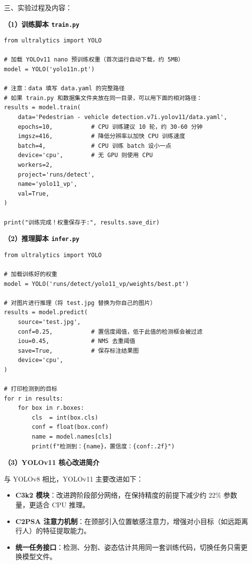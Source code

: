\documentclass[12pt, a4paper]{article}
\begin{document}
\begin{labbox}{三、实验过程及内容：}{}
 
\textbf{（1）训练脚本 \texttt{train.py}}
 
\begin{lstlisting}
from ultralytics import YOLO
 
# 加载 YOLOv11 nano 预训练权重（首次运行自动下载，约 5MB）
model = YOLO('yolo11n.pt')
 
# 注意：data 填写 data.yaml 的完整路径
# 如果 train.py 和数据集文件夹放在同一目录，可以用下面的相对路径：
results = model.train(
    data='Pedestrian - vehicle detection.v7i.yolov11/data.yaml',
    epochs=10,           # CPU 训练建议 10 轮，约 30-60 分钟
    imgsz=416,           # 降低分辨率以加快 CPU 训练速度
    batch=4,             # CPU 训练 batch 设小一点
    device='cpu',        # 无 GPU 则使用 CPU
    workers=2,
    project='runs/detect',
    name='yolo11_vp',
    val=True,
)
 
print("训练完成！权重保存于:", results.save_dir)
\end{lstlisting}
 
\textbf{（2）推理脚本 \texttt{infer.py}}
 
\begin{lstlisting}
from ultralytics import YOLO
 
# 加载训练好的权重
model = YOLO('runs/detect/yolo11_vp/weights/best.pt')
 
# 对图片进行推理（将 test.jpg 替换为你自己的图片）
results = model.predict(
    source='test.jpg',
    conf=0.25,           # 置信度阈值，低于此值的检测框会被过滤
    iou=0.45,            # NMS 去重阈值
    save=True,           # 保存标注结果图
    device='cpu',
)
 
# 打印检测到的目标
for r in results:
    for box in r.boxes:
        cls  = int(box.cls)
        conf = float(box.conf)
        name = model.names[cls]
        print(f"检测到：{name}，置信度：{conf:.2f}")
\end{lstlisting}
 
\textbf{（3）YOLOv11 核心改进简介}
 
与 YOLOv8 相比，YOLOv11 主要改进如下：
\begin{itemize}[leftmargin=2em, itemsep=0.2em]
    \item \textbf{C3k2 模块}：改进跨阶段部分网络，在保持精度的前提下减少约 22\% 参数量，更适合 CPU 推理。
    \item \textbf{C2PSA 注意力机制}：在颈部引入位置敏感注意力，增强对小目标（如远距离行人）的特征提取能力。
    \item \textbf{统一任务接口}：检测、分割、姿态估计共用同一套训练代码，切换任务只需更换模型文件。
\end{itemize}
 

\end{labbox}
\end{document}
